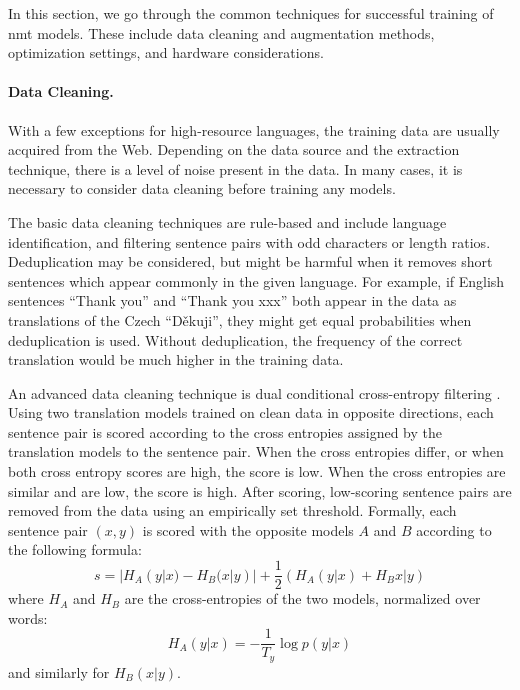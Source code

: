 In this section, we go through the common techniques for successful training of
\ac{nmt} models. These include data cleaning and augmentation methods,
optimization settings, and hardware considerations.

\paragraph{Data Cleaning.} With a few exceptions for high-resource languages,
the training data are usually acquired from the Web. Depending on the data
source and the extraction technique, there is a level of noise present in the
data. In many cases, it is necessary to consider data cleaning before training
any models.

The basic data cleaning techniques are rule-based and include language
identification, and filtering sentence pairs with odd characters or length
ratios. Deduplication may be considered, but might be harmful when it removes
short sentences which appear commonly in the given language. For example, if
English sentences ``Thank you'' and ``Thank you xxx'' both appear in the data
as translations of the Czech ``Děkuji'', they might get equal probabilities
when deduplication is used. Without deduplication, the frequency of the correct
translation would be much higher in the training data.

An advanced data cleaning technique is dual conditional cross-entropy filtering
\citep{junczys-dowmunt-2018-dual}. Using two translation models trained on
clean data in opposite directions, each sentence pair is scored according to
the cross entropies assigned by the translation models to the sentence
pair. When the cross entropies differ, or when both cross entropy scores are
high, the score is low. When the cross entropies are similar and are low, the
score is high. After scoring, low-scoring sentence pairs are removed from the
data using an empirically set threshold. Formally, each sentence pair $(x,y)$
is scored with the opposite models $A$ and $B$ according to the following
formula:
%
\begin{equation}
  s = |H_A(y|x) - H_B(x|y)| + \frac{1}{2} (H_A(y|x) + H_B{x|y})
\end{equation}
where $H_A$ and $H_B$ are the cross-entropies of the two models, normalized
over words:
%
\begin{equation}
  H_A(y|x) = - \frac{1}{T_y} \log p(y|x)
\end{equation}
and similarly for $H_B(x|y)$.

